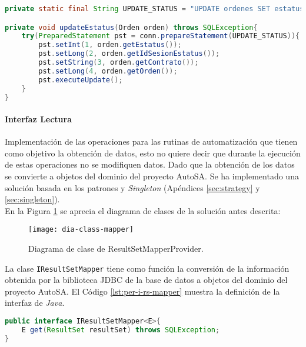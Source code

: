 \begin{enumerate}
	\begin{lstlisting}[language=Java, caption={Actualización del estado de una orden de reposición.}, captionpos=b, label={lst:per-update-status}]
private static final String UPDATE_STATUS = "UPDATE ordenes SET estatus = ?, fecha_estatus = CURRENT_TIMESTAMP, id_sesion_estatus = ? WHERE contrato = ? AND orden = ?";

private void updateEstatus(Orden orden) throws SQLException{
	try(PreparedStatement pst = conn.prepareStatement(UPDATE_STATUS)){
		pst.setInt(1, orden.getEstatus());
		pst.setLong(2, orden.getIdSesionEstatus());
		pst.setString(3, orden.getContrato());
		pst.setLong(4, orden.getOrden());
		pst.executeUpdate();
	}
}
	\end{lstlisting}
\end{enumerate}

\paragraph{\indent Interfaz Lectura\\}
Implementación de las operaciones para las rutinas de automatización que tienen como objetivo la obtención de datos, esto no quiere decir que durante la ejecución de estas operaciones no se modifiquen datos.
Dado que la obtención de los datos se convierte a objetos del dominio del proyecto AutoSA. Se ha implementado una solución basada en los patrones  y \textit{Singleton} (Apéndices \ref{sec:strategy} y \ref{sec:singleton}). \\
En la Figura \ref{fig:dia-class-mapper} se aprecia el diagrama de clases de la solución antes descrita:
\begin{figure}[h]
	\centering
	\texttt{[image: dia-class-mapper]}
	\caption{Diagrama de clase de ResultSetMapperProvider.}
	\label{fig:dia-class-mapper}
\end{figure}

La clase \texttt{IResultSetMapper} tiene como función la conversión de la información obtenida por la biblioteca JDBC de la base de datos a objetos del dominio del proyecto AutoSA. El Código \ref{lst:per-i-rs-mapper} muestra la definición de la interfaz de \textit{Java}.
	\begin{lstlisting}[language=Java, caption={Interfaz IResultSetMapper.}, captionpos=b, label={lst:per-i-rs-mapper}]
public interface IResultSetMapper<E>{
	E get(ResultSet resultSet) throws SQLException;
}
	\end{lstlisting}

